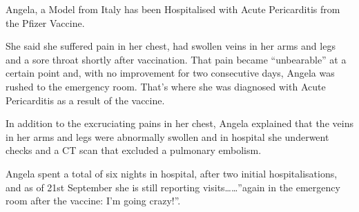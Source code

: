 Angela, a Model from Italy has been Hospitalised with Acute Pericarditis from
the Pfizer Vaccine.

She said she suffered pain in her chest, had swollen veins in her arms and legs
and a sore throat shortly after vaccination. That pain became “unbearable” at a
certain point and, with no improvement for two consecutive days, Angela was
rushed to the emergency room. That’s where she was diagnosed with Acute
Pericarditis as a result of the vaccine.

In addition to the excruciating pains in her chest, Angela explained that the
veins in her arms and legs were abnormally swollen and in hospital she underwent
checks and a CT scan that excluded a pulmonary embolism.

Angela spent a total of six nights in hospital, after two initial
hospitalisations, and as of 21st September she is still reporting visits……”again
in the emergency room after the vaccine: I’m going crazy!”.

